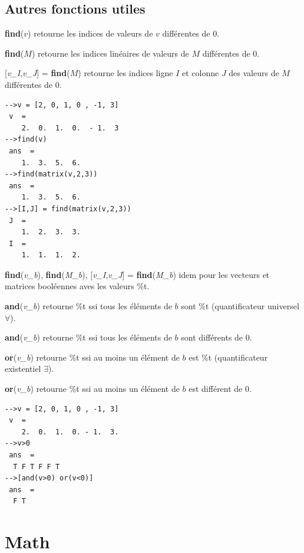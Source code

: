 \documentclass{article}
\begin{document}
\begin{multicols}{3}
\subsection*{Autres fonctions utiles}
\begin{description}
\item{\textbf{find}($v$)} retourne les indices de valeurs de $v$ différentes de 0.
\item{\textbf{find}($M$)} retourne les indices linéaires de valeurs de $M$ 
différentes de 0.
\item{[\textit{v\_I},\textit{v\_J}] = \textbf{find}($M$)} retourne les indices ligne $I$ et colonne $J$  des valeurs de $M$ différentes de 0.
\begin{verbatim}
-->v = [2, 0, 1, 0 , -1, 3]
 v  =
    2.  0.  1.  0.  - 1.  3
-->find(v)
 ans  =
    1.  3.  5.  6.
-->find(matrix(v,2,3))
 ans  =
    1.  3.  5.  6.
-->[I,J] = find(matrix(v,2,3))
 J  =
    1.  2.  3.  3.  
 I  =
    1.  1.  1.  2. 
\end{verbatim}
\item{\textbf{find}(\textit{v\_b}), \textbf{find}(\textit{M\_b}),  [\textit{v\_I},\textit{v\_J}] = \textbf{find}(\textit{M\_b})} idem pour les vecteurs et matrices booléennes aves les valeurs \%t.
\item{\textbf{and}(\textit{v\_b})} retourne \%t ssi tous les éléments de $b$ sont \%t (quantificateur universel $\forall$).
\item{\textbf{and}(\textit{v\_b})} retourne \%t ssi tous les éléments de $b$ sont différents de 0.
\item{\textbf{or}(\textit{v\_b})} retourne \%t ssi au moins un élément de $b$ est \%t (quantificateur existentiel $\exists$).
\item{\textbf{or}(\textit{v\_b})} retourne \%t ssi au moins un élément de $b$ est différent de 0.
\begin{verbatim}
-->v = [2, 0, 1, 0 , -1, 3]
 v  =
    2.  0.  1.  0. - 1.  3.  
-->v>0
 ans  =
  T F T F F T  
-->[and(v>0) or(v<0)]
 ans  =
  F T
\end{verbatim}
\end{description}
\section*{Math}

\end{multicols}
\end{document}
